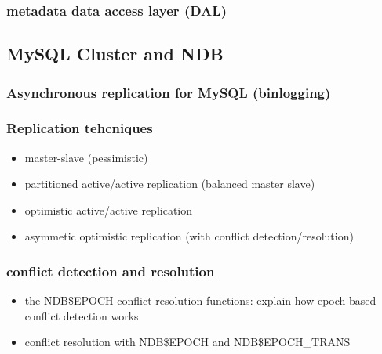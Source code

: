 \subsubsection{metadata data access layer (DAL)}

\subsection{MySQL Cluster and NDB}
\subsubsection{Asynchronous replication for MySQL (binlogging)}
\subsubsection{Replication tehcniques}
\begin{itemize}
  \item master-slave (pessimistic)
  \item partitioned active/active replication (balanced master slave)
  \item optimistic active/active replication
  \item asymmetic optimistic replication (with conflict detection/resolution)
\end{itemize}

\subsubsection{conflict detection and resolution}
\begin{itemize}
\item the NDB\$EPOCH conflict resolution functions: explain how epoch-based conflict detection works
\item conflict resolution with NDB\$EPOCH and NDB\$EPOCH\_TRANS
\end{itemize}